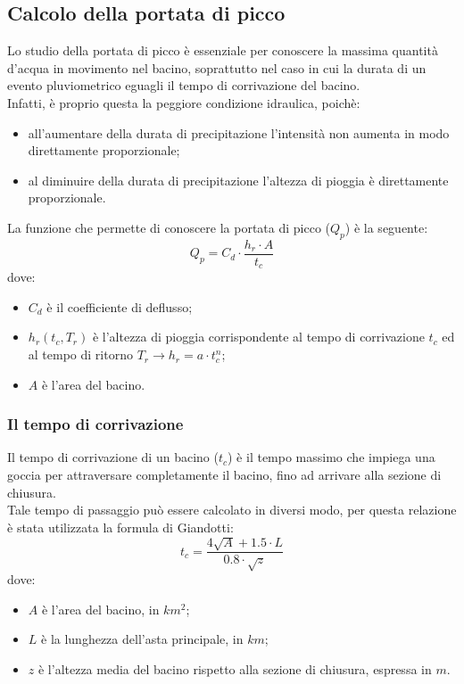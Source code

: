 \subsection{Calcolo della portata di picco}
Lo studio della portata di picco è essenziale per conoscere la massima quantità d'acqua in movimento nel bacino, soprattutto nel caso in cui la durata di un evento pluviometrico eguagli il tempo di corrivazione del bacino.\\
Infatti, è proprio questa la peggiore condizione idraulica, poichè:
\begin{itemize}
    \item all'aumentare della durata di precipitazione l'intensità non aumenta in modo direttamente proporzionale;
    \item al diminuire della durata di precipitazione l'altezza di pioggia è direttamente proporzionale.
\end{itemize}
La funzione che permette di conoscere la portata di picco ($Q_p$) è la seguente:
\begin{equation}
    Q_p = C_d \cdot \frac{h_r \cdot A}{t_c}
    \label{Qp}
\end{equation}
dove: 
\begin{itemize}
    \item $C_d$ è il coefficiente di deflusso;
    \item $h_r(t_c, T_r)$ è l'altezza di pioggia corrispondente al tempo di corrivazione $t_c$ ed al tempo di ritorno $T_r \rightarrow h_r = a \cdot t_c ^n$;
    \item $A$ è l'area del bacino.
\end{itemize}
\subsubsection*{Il tempo di corrivazione}
Il tempo di corrivazione di un bacino ($t_c$) è il tempo massimo che impiega una goccia per attraversare completamente il bacino, fino ad arrivare alla sezione di chiusura.\\
Tale tempo di passaggio può essere calcolato in diversi modo, per questa relazione è stata utilizzata la formula di Giandotti:
\begin{equation}
    t_c = \frac{4 \sqrt{A} + 1.5 \cdot L}{0.8 \cdot \sqrt{z}}
    \label{giandotti}
\end{equation}
dove: 
\begin{itemize}
    \item $A$ è l'area del bacino, in $km^2$;
    \item $L$ è la lunghezza dell'asta principale, in $km$;
    \item $z$ è l'altezza media del bacino rispetto alla sezione di chiusura, espressa in $m$.
\end{itemize}
